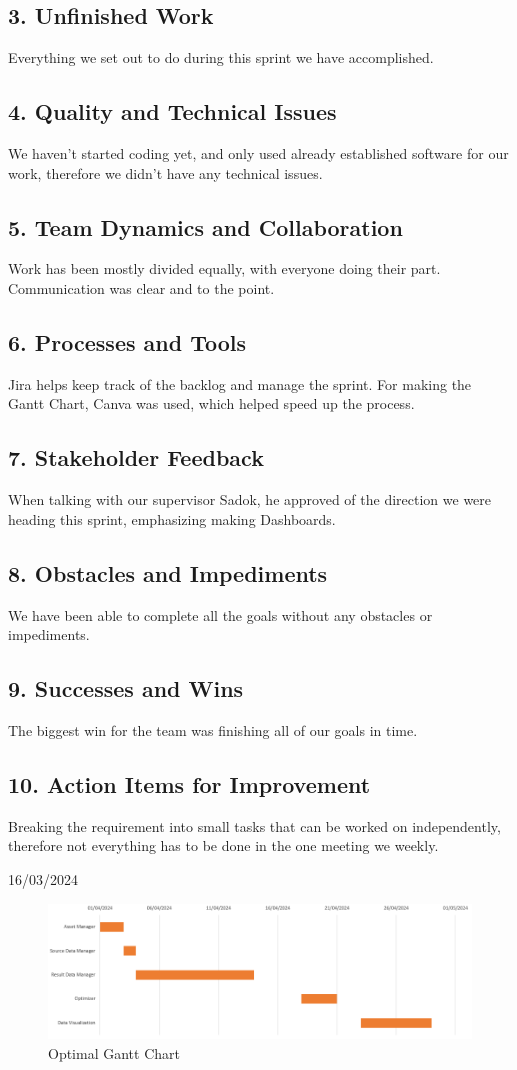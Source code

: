 \documentclass[12pt]{report}
\begin{document}
\subsection*{3. Unfinished Work}
Everything we set out to do during this sprint we have accomplished.
\subsection*{4. Quality and Technical Issues}
We haven't started coding yet, and only used already established software for our work, therefore we didn't have any technical issues.
\subsection*{5. Team Dynamics and Collaboration}
Work has been mostly divided equally, with everyone doing their part. Communication was clear and to the point.
\subsection*{6. Processes and Tools}
Jira helps keep track of the backlog and manage the sprint. For making the Gantt Chart, Canva was used, which helped speed up the process.
\subsection*{7. Stakeholder Feedback}
When talking with our supervisor Sadok, he approved of the direction we were heading this sprint, emphasizing making Dashboards.
\subsection*{8. Obstacles and Impediments}
We have been able to complete all the goals without any obstacles or impediments.
\subsection*{9. Successes and Wins}
The biggest win for the team was finishing all of our goals in time.
\subsection*{10. Action Items for Improvement}
Breaking the requirement into small tasks that can be worked on independently, therefore not everything has to be done in the one meeting we weekly.

\hfill 16/03/2024


\begin{figure}[H]
  \centering
  \includegraphics[width=1\textwidth]{Resources/1-Sprint/Gantt-Chart-Optimal.png}
  \caption{Optimal Gantt Chart}
  \label{fig:OptGanttChart}
\end{figure}
\end{document}

